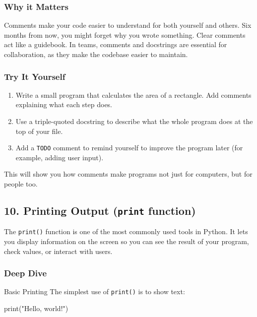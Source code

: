 \documentclass[
  letterpaper,
  DIV=11,
  numbers=noendperiod]{scrreprt}
\newenvironment{Shaded}{\begin{snugshade}}{\end{snugshade}}
\newcommand{\BuiltInTok}[1]{\textcolor[rgb]{0.00,0.23,0.31}{#1}}
\newcommand{\NormalTok}[1]{\textcolor[rgb]{0.00,0.23,0.31}{#1}}
\newcommand{\StringTok}[1]{\textcolor[rgb]{0.13,0.47,0.30}{#1}}
\providecommand{\tightlist}{%
  \setlength{\itemsep}{0pt}\setlength{\parskip}{0pt}}
\begin{document}
\subsubsection{Why it Matters}\label{why-it-matters-9}

Comments make your code easier to understand for both yourself and
others. Six months from now, you might forget why you wrote something.
Clear comments act like a guidebook. In teams, comments and docstrings
are essential for collaboration, as they make the codebase easier to
maintain.

\subsubsection{Try It Yourself}\label{try-it-yourself-9}

\begin{enumerate}
\def\labelenumi{\arabic{enumi}.}
\tightlist
\item
  Write a small program that calculates the area of a rectangle. Add
  comments explaining what each step does.
\item
  Use a triple-quoted docstring to describe what the whole program does
  at the top of your file.
\item
  Add a \texttt{TODO} comment to remind yourself to improve the program
  later (for example, adding user input).
\end{enumerate}

This will show you how comments make programs not just for computers,
but for people too.

\subsection{\texorpdfstring{10. Printing Output (\texttt{print}
function)}{10. Printing Output (print function)}}\label{printing-output-print-function}

The \texttt{print()} function is one of the most commonly used tools in
Python. It lets you display information on the screen so you can see the
result of your program, check values, or interact with users.

\subsubsection{Deep Dive}\label{deep-dive-10}

Basic Printing The simplest use of \texttt{print()} is to show text:

\begin{Shaded}
\begin{Highlighting}[]
\BuiltInTok{print}\NormalTok{(}\StringTok{"Hello, world!"}\NormalTok{)}
\end{Highlighting}
\end{Shaded}
\end{document}
